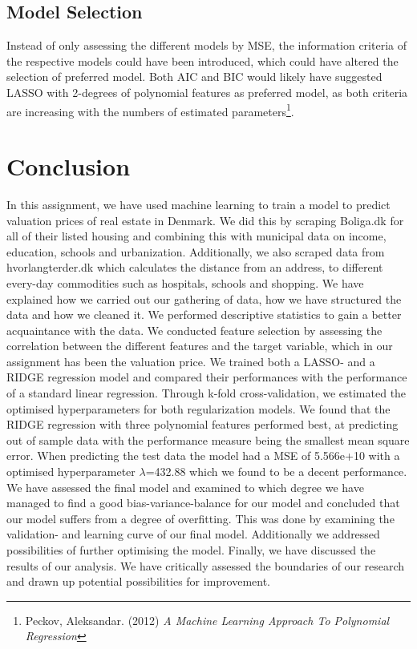 \documentclass[12pt,a4paper]{article}
\begin{document}
\subsection{Model Selection}
Instead of only assessing the different models by MSE,
the information criteria of the respective models could have been introduced, which could have altered the selection of preferred model. Both AIC and BIC would likely have suggested LASSO with 2-degrees of polynomial features as preferred model, as both criteria are increasing with the numbers of estimated parameters\footnote{Peckov, Aleksandar. (2012)  \textit{A Machine Learning Approach To Polynomial Regression}}. 

\section{Conclusion}
In this assignment, we have used machine learning to train a model to predict valuation prices of real estate in Denmark. We did this by scraping Boliga.dk for all of their listed housing and combining this with municipal data on income, education, schools and urbanization. Additionally, we also scraped data from hvorlangterder.dk which calculates the distance from an address, to different every-day commodities such as hospitals, schools and shopping. 
We have explained how we carried out our gathering of data, how we have structured the data and how we cleaned it. \newline
We performed descriptive statistics to gain a better acquaintance with the data. 
We conducted feature selection by assessing the correlation between the different features and the target variable, which in our assignment has been the valuation price. 
We trained both a LASSO- and a RIDGE regression model and compared their performances with the performance of a standard linear regression. Through k-fold cross-validation, we estimated the optimised hyperparameters for both regularization models. We found that the RIDGE regression with three polynomial features performed best, at predicting out of sample data with the performance measure being the smallest mean square error. When predicting the test data the model had a MSE of 5.566e+10 with a optimised hyperparameter $\lambda$=432.88 which we found to be a decent performance. 
We have assessed the final model and examined to which degree we have managed to find a good bias-variance-balance for our model and concluded that our model suffers from a degree of overfitting. This was done by examining the validation- and learning curve of our final model. Additionally we addressed possibilities of further optimising the model.  \newline
Finally, we have discussed the results of our analysis. We have critically assessed the boundaries of our research and drawn up potential possibilities for improvement. 
\end{document}
